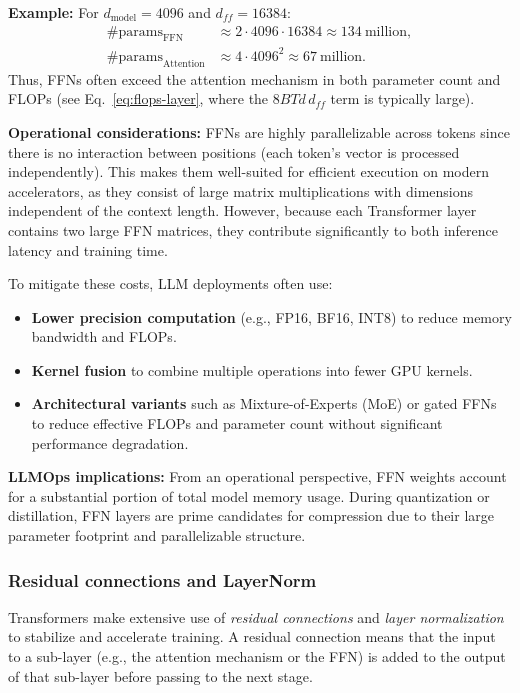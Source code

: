 \noindent\textbf{Example:}  
For $d_{\text{model}} = 4096$ and $d_{ff} = 16384$:
\begin{align}
\#\text{params}_{\text{FFN}} &\approx 2 \cdot 4096 \cdot 16384 \approx 134 \ \text{million}, \\
\#\text{params}_{\text{Attention}} &\approx 4 \cdot 4096^2 \approx 67 \ \text{million}.
\end{align}
Thus, FFNs often exceed the attention mechanism in both parameter count and FLOPs (see Eq.~\ref{eq:flops-layer}, where the $8 B T d \, d_{ff}$ term is typically large).  

\noindent\textbf{Operational considerations:}  
FFNs are highly parallelizable across tokens since there is no interaction between positions (each token’s vector is processed independently). This makes them well-suited for efficient execution on modern accelerators, as they consist of large matrix multiplications with dimensions independent of the context length. However, because each Transformer layer contains two large FFN matrices, they contribute significantly to both inference latency and training time.  

To mitigate these costs, LLM deployments often use:
\begin{itemize}
    \item \textbf{Lower precision computation} (e.g., FP16, BF16, INT8) to reduce memory bandwidth and FLOPs.
    \item \textbf{Kernel fusion} to combine multiple operations into fewer GPU kernels.
    \item \textbf{Architectural variants} such as Mixture-of-Experts (MoE) or gated FFNs to reduce effective FLOPs and parameter count without significant performance degradation.
\end{itemize}

\noindent\textbf{LLMOps implications:}  
From an operational perspective, FFN weights account for a substantial portion of total model memory usage. During quantization or distillation, FFN layers are prime candidates for compression due to their large parameter footprint and parallelizable structure.


\subsubsection{Residual connections and LayerNorm}
Transformers make extensive use of \emph{residual connections} and \emph{layer normalization} to stabilize and accelerate training. A residual connection means that the input to a sub-layer (e.g., the attention mechanism or the FFN) is added to the output of that sub-layer before passing to the next stage.  

